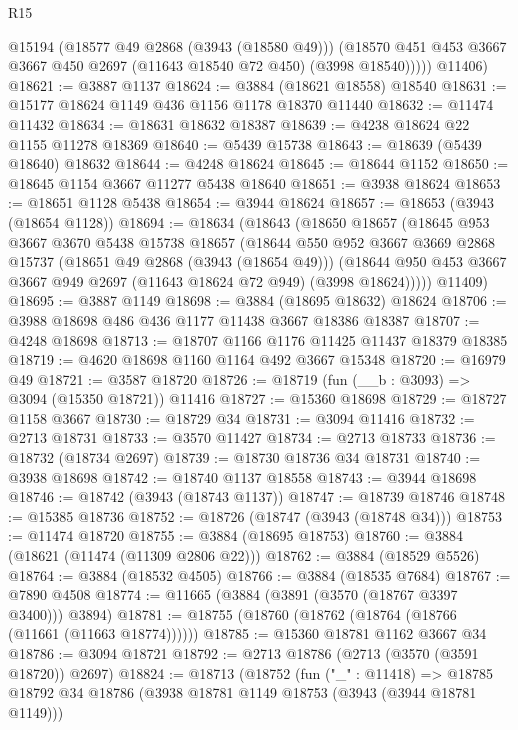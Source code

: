 \begin{lexlean}{R15}
\begin{coremodule}
            @15194
            (@18577 @49 @2868 (@3943 (@18580 @49)))
            (@18570 @451 @453 @3667 @3667 @450 @2697 (@11643 @18540 @72 @450) (@3998 @18540)))))
      @11406)
@18621 := @3887 @1137
@18624 := @3884 (@18621 @18558) @18540
@18631 := @15177 @18624 @1149 @436 @1156 @1178 @18370 @11440
@18632 := @11474 @11432
@18634 := @18631 @18632 @18387
@18639 := @4238 @18624 @22 @1155 @11278 @18369
@18640 := @5439 @15738
@18643 := @18639 (@5439 @18640) @18632
@18644 := @4248 @18624
@18645 := @18644 @1152
@18650 := @18645 @1154 @3667 @11277 @5438 @18640
@18651 := @3938 @18624
@18653 := @18651 @1128 @5438
@18654 := @3944 @18624
@18657 := @18653 (@3943 (@18654 @1128))
@18694 := @18634
    (@18643
      (@18650
        @18657
        (@18645
          @953
          @3667
          @3670
          @5438
          @15738
          @18657
          (@18644
            @550
            @952
            @3667
            @3669
            @2868
            @15737
            (@18651 @49 @2868 (@3943 (@18654 @49)))
            (@18644 @950 @453 @3667 @3667 @949 @2697 (@11643 @18624 @72 @949) (@3998 @18624)))))
      @11409)
@18695 := @3887 @1149
@18698 := @3884 (@18695 @18632) @18624
@18706 := @3988 @18698 @486 @436 @1177 @11438 @3667 @18386 @18387
@18707 := @4248 @18698
@18713 := @18707 @1166 @1176 @11425 @11437 @18379 @18385
@18719 := @4620 @18698 @1160 @1164 @492 @3667 @15348
@18720 := @16979 @49
@18721 := @3587 @18720
@18726 := @18719 (fun (__b : @3093) => @3094 (@15350 @18721)) @11416
@18727 := @15360 @18698
@18729 := @18727 @1158 @3667
@18730 := @18729 @34
@18731 := @3094 @11416
@18732 := @2713 @18731
@18733 := @3570 @11427
@18734 := @2713 @18733
@18736 := @18732 (@18734 @2697)
@18739 := @18730 @18736 @34 @18731
@18740 := @3938 @18698
@18742 := @18740 @1137 @18558
@18743 := @3944 @18698
@18746 := @18742 (@3943 (@18743 @1137))
@18747 := @18739 @18746
@18748 := @15385 @18736
@18752 := @18726 (@18747 (@3943 (@18748 @34)))
@18753 := @11474 @18720
@18755 := @3884 (@18695 @18753)
@18760 := @3884 (@18621 (@11474 (@11309 @2806 @22)))
@18762 := @3884 (@18529 @5526)
@18764 := @3884 (@18532 @4505)
@18766 := @3884 (@18535 @7684)
@18767 := @7890 @4508
@18774 := @11665 (@3884 (@3891 (@3570 (@18767 @3397 @3400))) @3894)
@18781 := @18755 (@18760 (@18762 (@18764 (@18766 (@11661 (@11663 @18774))))))
@18785 := @15360 @18781 @1162 @3667 @34
@18786 := @3094 @18721
@18792 := @2713 @18786 (@2713 (@3570 (@3591 @18720)) @2697)
@18824 := @18713
    (@18752
      (fun ("_" : @11418) =>
      @18785
        @18792
        @34
        @18786
        (@3938 @18781 @1149 @18753 (@3943 (@3944 @18781 @1149)))

\end{coremodule}
\end{lexlean}
